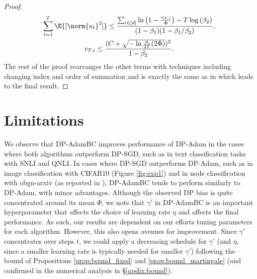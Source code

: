 \documentclass[letterpaper]{article} %
\begin{document}
\begin{proof}
    \begin{gather*}
        \sum_{t=1}^{T} \E{[\norm{u_t}^2]} \leq \frac{\sum_{i \in [d]} \ln{\big( 1-\frac{v_{T,i}}{\Phi} \big) - T \log{(\beta_2)}}}{(1-\beta_1)(1-\beta_1/\beta_2)} , \\
        v_{T,i} \leq \frac{(C + \sqrt{-\ln{\frac{\alpha}{2T}}(2\Phi)})^2}{1-\beta_2}.
    \end{gather*}
    The rest of the proof rearranges the other terms with techniques including changing index and order of summation and is exactly the same as in \citep{défossez2022simple} which leads to the final result.

\end{proof}


\section{Limitations}
We observe that DP-AdamBC improves performance of DP-Adam in the cases where both algorithms outperform DP-SGD, such as in text classification tasks with SNLI and QNLI. In cases where DP-SGD outperforms DP-Adam, such as in image classification with CIFAR10 (Figure \ref{fig:exp1}) and in node classification with obgn-arxiv (as reported in \citet{daigavane2022nodelevel}), DP-AdamBC tends to perform similarly to DP-Adam, with minor advantages.
%
Although the observed DP bias is quite concentrated around its mean $\Phi$, we note that $\gamma'$ in DP-AdamBC is an important hyperparameter that affects the choice of learning rate $\eta$ and affects the final performance. As such, our results are dependent on our efforts tuning parameters for each algorithm.
%
However, this also opens avenues for improvement. Since $\gamma'$ concentrates over steps $t$, we could apply a decreasing schedule for $\gamma'$ (and $\eta$, since a smaller learning rate is typically needed for smaller $\gamma'$) following the bound of Propositions \ref{prop:bound_fixed} and \ref{prop:bound_martingale} (and confirmed in the numerical analysis in \S \ref{apdix:bound}).
\end{document}
